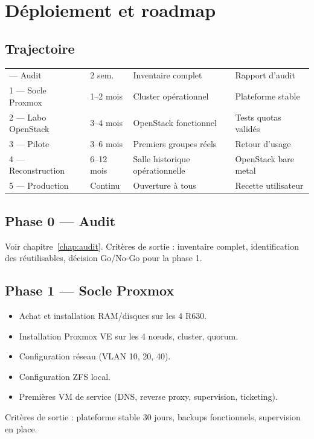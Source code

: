 \chapter{Déploiement et roadmap}
\label{chap:deploiement}

\section{Trajectoire}
\begin{xltabular}{\textwidth}{@{}llXl@{}}
\toprule
{} &  &  &  \\
\midrule
\endhead
\bottomrule
\endfoot
\bottomrule
{} — Audit & 2 sem. & Inventaire complet & Rapport d'audit \\
1 — Socle Proxmox & 1–2 mois & Cluster opérationnel & Plateforme stable \\
2 — Labo OpenStack & 3–4 mois & OpenStack fonctionnel & Tests quotas validés \\
3 — Pilote & 3–6 mois & Premiers groupes réels & Retour d'usage \\
4 — Reconstruction & 6–12 mois & Salle historique opérationnelle & OpenStack bare metal \\
5 — Production & Continu & Ouverture à tous & Recette utilisateur \\

\end{xltabular}

\section{Phase 0 — Audit}
Voir chapitre~\ref{chap:audit}. Critères de sortie : inventaire complet, identification des réutilisables, décision Go/No-Go pour la phase 1.

\section{Phase 1 — Socle Proxmox}
\begin{itemize}
  \item Achat et installation RAM/disques sur les 4 R630.
  \item Installation Proxmox VE sur les 4 nœuds, cluster, quorum.
  \item Configuration réseau (VLAN 10, 20, 40).
  \item Configuration ZFS local.
  \item Premières VM de service (DNS, reverse proxy, supervision, ticketing).
\end{itemize}
Critères de sortie : plateforme stable 30 jours, backups fonctionnels, supervision en place.


